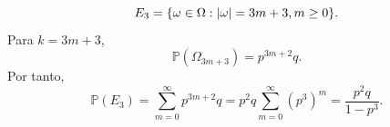 \documentclass[12pt,a4paper]{article}
\begin{document}
\begin{solucion}
\begin{enumerate}
            \begin{equation*}
                E_{3}=\{\omega\in\Omega:\abs{\omega}=3m+3,m\geq0\}.
            \end{equation*}
            Para $k=3m+3$,
            \begin{equation*}
                \mathbb{P}(\Omega_{3m+3})=p^{3m+2}q.
            \end{equation*}
            Por tanto,
            \begin{equation*}
                \mathbb{P}(E_{3})=\sum_{m=0}^{\infty}p^{3m+2}q=p^{2}q\sum_{m=0}^{\infty}(p^{3})^{m}=\frac{p^{2}q}{1-p^{3}}.
            \end{equation*}
        \end{enumerate}
    \end{solucion}
\end{document}

